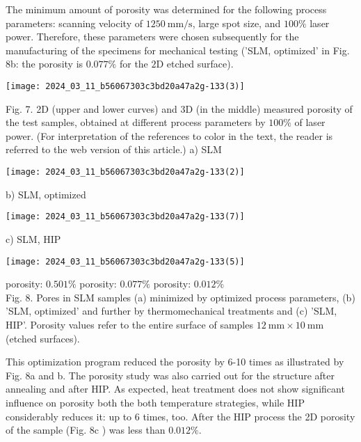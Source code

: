 \documentclass[10pt]{article}
\begin{document}
The minimum amount of porosity was determined for the following process parameters: scanning velocity of $1250 \mathrm{~mm} / \mathrm{s}$, large spot size, and $100 \%$ laser power. Therefore, these parameters were chosen subsequently for the manufacturing of the specimens for mechanical testing ('SLM, optimized' in Fig. 8b: the porosity is $0.077 \%$ for the $2 \mathrm{D}$ etched surface).

\begin{center}
\texttt{[image: 2024\_03\_11\_b56067303c3bd20a47a2g-133(3)]}
\end{center}

Fig. 7. 2D (upper and lower curves) and 3D (in the middle) measured porosity of the test samples, obtained at different process parameters by $100 \%$ of laser power. (For interpretation of the references to color in the text, the reader is referred to the web version of this article.) a) SLM

\begin{center}
\texttt{[image: 2024\_03\_11\_b56067303c3bd20a47a2g-133(2)]}
\end{center}

b) SLM, optimized

\begin{center}
\texttt{[image: 2024\_03\_11\_b56067303c3bd20a47a2g-133(7)]}
\end{center}

c) SLM, HIP

\begin{center}
\texttt{[image: 2024\_03\_11\_b56067303c3bd20a47a2g-133(5)]}
\end{center}

porosity: $0.501 \%$ porosity: $0.077 \%$ porosity: $0.012 \%$\\
Fig. 8. Pores in SLM samples (a) minimized by optimized process parameters, (b) 'SLM, optimized' and further by thermomechanical treatments and (c) 'SLM, HIP'. Porosity values refer to the entire surface of samples $12 \mathrm{~mm} \times 10 \mathrm{~mm}$ (etched surfaces).

This optimization program reduced the porosity by 6-10 times as illustrated by Fig. 8a and b. The porosity study was also carried out for the structure after annealing and after HIP. As expected, heat treatment does not show significant influence on porosity both the both temperature strategies, while HIP considerably reduces it: up to 6 times, too. After the HIP process the 2D porosity of the sample (Fig. $8 \mathrm{c}$ ) was less than $0.012 \%$.
\end{document}
